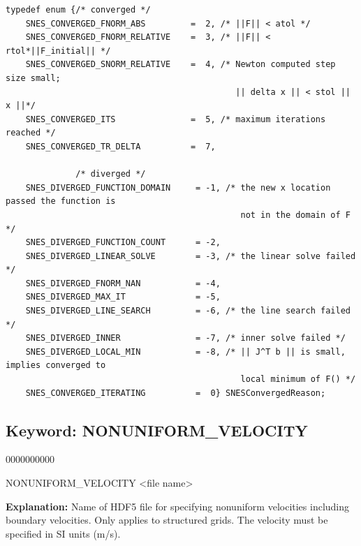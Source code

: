 
\scriptsize
\begin{Verbatim}
typedef enum {/* converged */
    SNES_CONVERGED_FNORM_ABS         =  2, /* ||F|| < atol */
    SNES_CONVERGED_FNORM_RELATIVE    =  3, /* ||F|| < rtol*||F_initial|| */
    SNES_CONVERGED_SNORM_RELATIVE    =  4, /* Newton computed step size small; 
                                              || delta x || < stol || x ||*/
    SNES_CONVERGED_ITS               =  5, /* maximum iterations reached */
    SNES_CONVERGED_TR_DELTA          =  7,
    
              /* diverged */
    SNES_DIVERGED_FUNCTION_DOMAIN     = -1, /* the new x location passed the function is 
                                               not in the domain of F */
    SNES_DIVERGED_FUNCTION_COUNT      = -2,
    SNES_DIVERGED_LINEAR_SOLVE        = -3, /* the linear solve failed */
    SNES_DIVERGED_FNORM_NAN           = -4,
    SNES_DIVERGED_MAX_IT              = -5,
    SNES_DIVERGED_LINE_SEARCH         = -6, /* the line search failed */
    SNES_DIVERGED_INNER               = -7, /* inner solve failed */
    SNES_DIVERGED_LOCAL_MIN           = -8, /* || J^T b || is small, implies converged to 
                                               local minimum of F() */
    SNES_CONVERGED_ITERATING          =  0} SNESConvergedReason;
\end{Verbatim}
\normalsize


\hyperlink{target_key}{\return}


\newpage
\protect\hypertarget{target_nonuniform_vel}{}

\subsection{Keyword: NONUNIFORM\_VELOCITY}

\hfill\hyperlink{target_key}{\return}

\begin{deflist}{0000000000}
\item[NONUNIFORM\_VELOCITY] <file name>
\end{deflist}

{\bf Explanation:} Name of HDF5 file for specifying nonuniform velocities including boundary velocities. Only applies to structured grids. The velocity must be specified in SI units (m/s).

